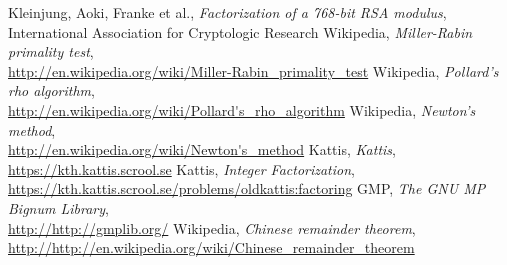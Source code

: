     Kleinjung, Aoki, Franke et al.,
    \emph{Factorization of a 768-bit RSA modulus}, \\
    International Association for Cryptologic Research
    Wikipedia, 
    \emph{Miller-Rabin primality test},\\
    \url{http://en.wikipedia.org/wiki/Miller-Rabin_primality_test}
    Wikipedia, 
    \emph{Pollard's rho algorithm},\\
    \url{http://en.wikipedia.org/wiki/Pollard's_rho_algorithm}
    Wikipedia, 
    \emph{Newton's method},\\
    \url{http://en.wikipedia.org/wiki/Newton's_method}
    Kattis,
    \emph{Kattis}, \\
    \url{https://kth.kattis.scrool.se}
    Kattis,
    \emph{Integer Factorization}, \\
    \url{https://kth.kattis.scrool.se/problems/oldkattis:factoring}
    GMP,
    \emph{The GNU MP Bignum Library}, \\
    \url{http://http://gmplib.org/}
    Wikipedia,
    \emph{Chinese remainder theorem}, \\
    \url{http://http://en.wikipedia.org/wiki/Chinese_remainder_theorem}
